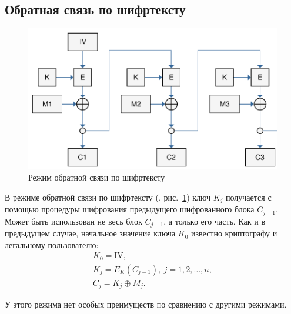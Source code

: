 \subsection{Обратная связь по шифртексту}

\begin{figure}[bt]
	\centering
	\includegraphics[width=1\textwidth]{pic/CFB}
	\caption{Режим обратной связи по шифртексту}
	\label{fig:CFB}
\end{figure}

В режиме обратной связи по шифртексту (, рис.~\ref{fig:CFB}) ключ $K_j$ получается с помощью процедуры шифрования предыдущего шифрованного блока $C_{j-1}$. Может быть использован не весь блок $C_{j-1}$, а только его часть. Как и в предыдущем случае, начальное значение ключа $K_0$ известно криптографу и легальному пользователю:
\[ \begin{array}{l}
    K_0 = \textrm{IV}, \\
    K_j = E_K(C_{j-1}), ~ j = 1, 2, \dots, n,\\
    C_j = K_j \oplus M_j.
\end{array} \]

У этого режима нет особых преимуществ по сравнению с другими режимами.
